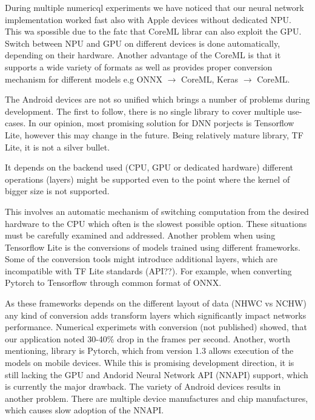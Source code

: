 \documentclass[a4paper,conference]{IEEEtran}
\begin{document}
During multiple numericql experiments we have noticed that our neural network implementation worked fast also with Apple devices without dedicated NPU. This wa spossible due to the fatc that CoreML librar can also exploit the GPU. Switch between NPU and GPU on different devices is done automatically, depending on their hardware. Another advantage of the CoreML is that it supports a wide variety of formats as well as provides proper conversion mechanism for different models e.g ONNX $\rightarrow$ CoreML, Keras $\rightarrow$ CoreML. 


The Android devices are not so unified which brings a number of problems during development. The first to follow, there is no single library to cover multiple use-cases. In our opinion, most promising solution for DNN porjects is Tensorflow Lite, however this may change in the future.  Being relatively  mature library, TF Lite,  it is not a silver bullet. 

It  depends on the backend used (CPU, GPU or dedicated hardware) different operations (layers) might be supported even to the point where the kernel of bigger size is not supported.

This involves an automatic mechanism of switching computation from the desired hardware to the CPU which often is the slowest possible option. These situations must be carefully examined and addressed. Another problem when using Tensorflow Lite is the conversions of models trained using different frameworks. Some of the conversion tools might introduce additional layers, which are incompatible with TF Lite standards (API??). For example, when converting Pytorch to Tensorflow through common format of ONNX. 

As these frameworks depends on the different layout of data (NHWC vs NCHW) any kind of conversion adds transform layers which significantly impact networks performance. Numerical experimets with conversion (not published) showed, that our application noted 30-40\% drop in the frames per second.
Another, worth mentioning, library is Pytorch, which from version 1.3 allows execution of the models on mobile devices. While this is promising development direction, it is still lacking the GPU and Andorid Neural Network API (NNAPI) support,  which is currently the major drawback. The variety of Android devices results in another problem. There are multiple device manufactures and chip manufactures, which causes slow adoption of the NNAPI. 
\end{document}
